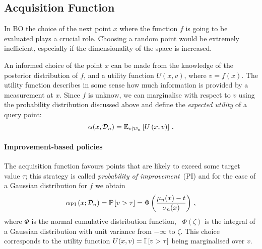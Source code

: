 \subsection{Acquisition Function}
\label{sec:AcqFun}

In BO the choice of the next point $x$ where the function $f$ is going to be
evaluated plays a crucial role. Choosing a random point would be extremely
inefficient, especially if the dimensionality of the space is increased. 

An informed choice of the point $x$ can be made from the knowledge of the
posterior distribution of $f$, and a utility function $U(x,v)$, where $v=f(x)$.
The utility function describes in some sense how much information is provided by
a measurement at $x$. Since $f$ is unknow, we can marginalise with respect to
$v$ using the probability distribution discussed above and define the {\em
expected utility} of a query point:
\begin{equation}
    \label{eq:ExpUtilDef}
    \alpha(x,\mathcal{D}_n) = \mathbb{E}_{v|\mathcal{D}_n}\left[U\left(x,v\right)\right]\, .
\end{equation} 

\paragraph[]{Improvement-based policies}

The acquisition function favours points that are likely to exceed some target value $\tau$; this strategy is called {\em probability of improvement}\ (PI) and for the case of a Gaussian distribution for $f$ we obtain
\begin{equation}
    \label{eq:AlphaPI}
    \alpha_{\mathrm{PI}}\left(x;\mathcal{D}_n\right) = 
    \mathbb{P}\left[v>\tau\right] = 
    \Phi\left(
        \frac{\mu_n(x)-t}{\sigma_n(x)}    
    \right)\, ,
\end{equation}
where $\Phi$ is the normal cumulative distribution function, \ie\ $\Phi(\zeta)$
is the integral of a Gaussian distribution with unit variance from $-\infty$ to
$\zeta$. This choice corresponds to the utility function
$U(x,v)=\mathbb{I}\left[v>\tau\right]$ being marginalised over $v$.

